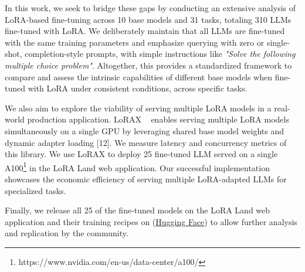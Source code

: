 In this work, we seek to bridge these gaps by conducting an extensive analysis of LoRA-based fine-tuning across 10 base models and 31 tasks, totaling 310 LLMs fine-tuned with LoRA. We deliberately maintain that all LLMs are fine-tuned with the same training parameters and emphasize querying with zero or single-shot, completion-style prompts, with simple instructions like \textit{"Solve the following multiple choice problem"}. Altogether, this provides a standardized framework to compare and assess the intrinsic capabilities of different base models when fine-tuned with LoRA under consistent conditions, across specific tasks.

We also aim to explore the viability of serving multiple LoRA models in a real-world production application. LoRAX ~\cite{12predibaseLoRAExchange} enables serving multiple LoRA models simultaneously on a single GPU by leveraging shared base model weights and dynamic adapter loading [12]. We measure latency and concurrency metrics of this library. We use LoRAX to deploy 25 fine-tuned LLM served on a single A100\footnote{https://www.nvidia.com/en-us/data-center/a100/} in the LoRA Land web application. Our successful implementation showcases the economic efficiency of serving multiple LoRA-adapted LLMs for specialized tasks.

Finally, we release all 25 of the fine-tuned models on the LoRA Land web application and their training recipes on (\href{https://huggingface.co/predibase}{Hugging Face}) to allow further analysis and replication by the community.
